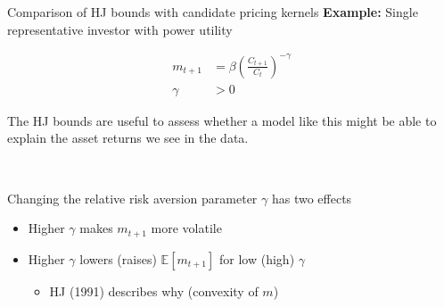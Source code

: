 \documentclass[xcolor=table, aspectratio=169]{beamer}
\newcommand{\E}{\mathbb{E}}
\begin{document}
\begin{frame}{Comparison of HJ bounds with candidate pricing kernels}
\textbf{Example:} Single representative investor with power utility

\begin{align*}
m_{t+1} &= \beta \left( \frac{C_{t+1}}{C_t} \right)^{-\gamma}\\
\gamma &> 0
\end{align*}

The HJ bounds are useful to assess whether a model like this might be able to explain the asset returns we see in the data. 

~

Changing the relative risk aversion parameter $\gamma$ has two effects

\begin{itemize}

\item Higher $\gamma$ makes $m_{t+1}$ more volatile

\item Higher $\gamma$ lowers (raises) $\E[m_{t+1}]$ for low (high) $\gamma$
\begin{itemize}
\item HJ (1991) describes why (convexity of $m$)
\end{itemize}



\end{itemize}

\end{frame}
\end{document}
